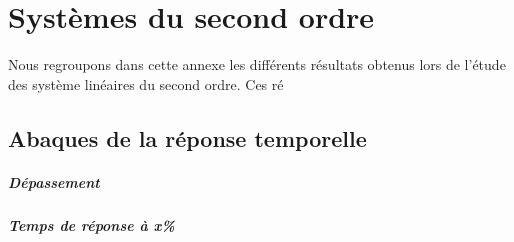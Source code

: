 \chapter{Systèmes du second ordre\label{annexe-2nd}}
Nous regroupons dans cette annexe les différents résultats obtenus lors de 
l'étude des système linéaires du second ordre. Ces ré
\newpage
\section{Abaques de la réponse temporelle}

\paragraph{Dépassement}
\begin{figure}[!h]
\centering
    
\end{figure}

\paragraph{Temps de réponse à x\%}
\begin{figure}[!b]
\centering
    
\end{figure}

